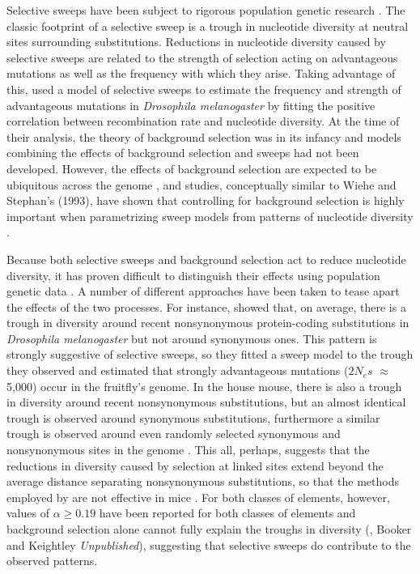 Selective sweeps have been subject to rigorous population genetic research \citep{RN124, RN226, RN278, RN235}. The classic footprint of a selective sweep is a trough in nucleotide diversity at neutral sites surrounding substitutions. Reductions in nucleotide diversity caused by selective sweeps are related to the strength of selection acting on advantageous mutations as well as the frequency with which they arise. Taking advantage of this, \cite{RN277} used a model of selective sweeps to estimate the frequency and strength of advantageous mutations in \textit{Drosophila melanogaster} by fitting the positive correlation between recombination rate and nucleotide diversity. At the time of their analysis, the theory of background selection was in its infancy and models combining the effects of background selection and sweeps had not been developed. However, the effects of background selection are expected to be ubiquitous across the genome \citep{RN116, RN274, RN120}, and studies, conceptually similar to Wiehe and Stephan's (1993), have shown that controlling for background selection is highly important when parametrizing sweep models from patterns of nucleotide diversity \citep{RN323, RN274}.

Because both selective sweeps and background selection act to reduce nucleotide diversity, it has proven difficult to distinguish their effects using population genetic data \citep{RN339}. A number of different approaches have been taken to tease apart the effects of the two processes. For instance, \cite{RN167} showed that, on average, there is a trough in diversity around recent nonsynonymous protein-coding substitutions in \textit{Drosophila melanogaster} but not around synonymous ones. This pattern is strongly suggestive of selective sweeps, so they \citep{RN167} fitted a sweep model to the trough they observed and estimated that strongly advantageous mutations ($2N_es$ $\approx$ 5,000) occur in the fruitfly's genome.  In the house mouse, there is also a trough in diversity around recent nonsynonymous substitutions, but an almost identical trough is observed around synonymous substitutions, furthermore a similar trough is observed around even randomly selected synonymous and nonsynonymous sites in the genome \citep{RN122}. This all, perhaps, suggests that the reductions in diversity caused by selection at linked sites extend beyond the average distance separating nonsynonymous substitutions, so that the methods employed by \cite{RN167} are not effective in mice \citep{RN122}. For both classes of elements, however, values of $\alpha \geq 0.19$ have been reported for both classes of elements \citep{RN122} and background selection alone cannot fully explain the troughs in diversity (\citealt{RN122}, Booker and Keightley \textit{Unpublished}), suggesting that selective sweeps do contribute to the observed patterns.

